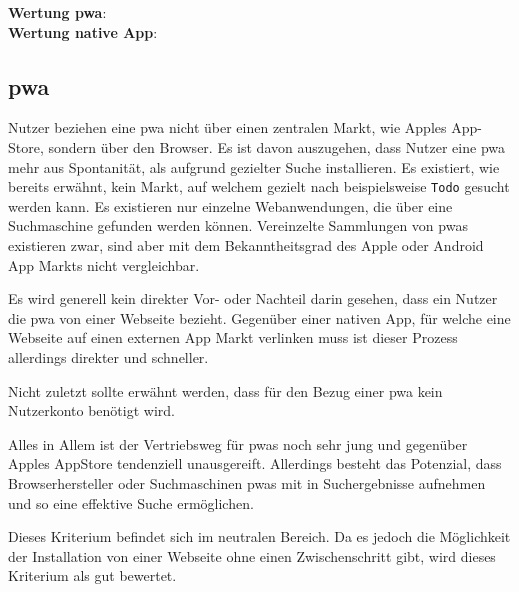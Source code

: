 \textbf{Wertung \ac{pwa}}:  \Circle \\
\textbf{Wertung native App}:  \\
\subsection{\ac{pwa}}
Nutzer beziehen eine \ac{pwa} nicht über einen zentralen Markt, wie Apples App-Store, sondern über den Browser. Es ist davon auszugehen, dass Nutzer eine \ac{pwa} mehr aus Spontanität, als aufgrund gezielter Suche installieren. Es existiert, wie bereits erwähnt, kein Markt, auf welchem gezielt nach beispielsweise \texttt{Todo} gesucht werden kann. Es existieren nur einzelne Webanwendungen, die über eine Suchmaschine gefunden werden können. Vereinzelte Sammlungen von \ac{pwa}s existieren zwar, sind aber mit dem Bekanntheitsgrad des Apple oder Android App Markts nicht vergleichbar.

Es wird generell kein direkter Vor- oder Nachteil darin gesehen, dass ein Nutzer die \ac{pwa} von einer Webseite bezieht. Gegenüber einer nativen App, für welche eine Webseite auf einen externen App Markt verlinken muss ist dieser Prozess allerdings direkter und schneller.

Nicht zuletzt sollte erwähnt werden, dass für den Bezug einer \ac{pwa} kein Nutzerkonto benötigt wird.

Alles in Allem ist der Vertriebsweg für \ac{pwa}s noch sehr jung und gegenüber Apples AppStore tendenziell unausgereift. Allerdings besteht das Potenzial, dass Browserhersteller oder Suchmaschinen \ac{pwa}s mit in Suchergebnisse aufnehmen und so eine effektive Suche ermöglichen.

Dieses Kriterium befindet sich im neutralen Bereich. Da es jedoch die Möglichkeit der Installation von einer Webseite ohne einen Zwischenschritt gibt, wird dieses Kriterium als gut bewertet.